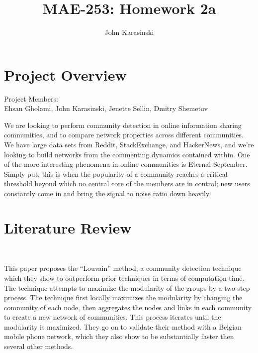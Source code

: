 \documentclass{tufte-handout}
\begin{document}
\title{MAE-253: Homework 2a}
\author[John Karasinski]{John Karasinski}
\maketitle%

\section{Project Overview}

Project Members: \\
Ehsan Gholami, John Karasinski, Jenette Sellin, Dmitry Shemetov \\
\vspace{1em}

We are looking to perform community detection in online information sharing communities, and to compare network properties across different communities. We have large data sets from Reddit, StackExchange, and HackerNews, and we're looking to build networks from the commenting dynamics contained within. One of the more interesting phenomena in online communities is Eternal September. Simply put, this is when the popularity of a community reaches a critical threshold beyond which no central core of the members are in control; new users constantly come in and bring the signal to noise ratio down heavily.

\section{Literature Review}

~\cite{blondel2008fast}

This paper proposes the ``Louvain'' method, a community detection technique which they show to outperform prior techniques in terms of computation time. The technique attempts to maximize the modularity of the groups by a two step process. The technique first locally maximizes the modularity by changing the community of each node, then aggregates the nodes and links in each community to create a new network of communities. This process iterates until the modularity is maximized. They go on to validate their method with a Belgian mobile phone network, which they also show to be substantially faster then several other methods. \\
\vspace{1em}

~\cite{girvan2002community}
\end{document}
